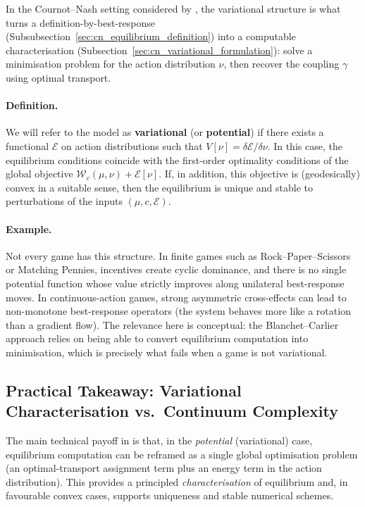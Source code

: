 In the Cournot--Nash setting considered by \cite{blanchet2016optimal}, the variational structure is what turns a
definition-by-best-response (Subsubsection~\ref{sec:cn_equilibrium_definition}) into a computable characterisation
(Subsection~\ref{sec:cn_variational_formulation}): solve a minimisation problem for the action distribution $\nu$, then
recover the coupling $\gamma$ using optimal transport.

\paragraph{Definition.}
We will refer to the model as \textbf{variational} (or \textbf{potential}) if there exists a functional
$\mathcal{E}$ on action distributions such that $V[\nu]=\delta\mathcal{E}/\delta\nu$.
In this case, the equilibrium conditions coincide with the first-order optimality conditions of the global objective
$\mathcal{W}_c(\mu,\nu)+\mathcal{E}[\nu]$.
If, in addition, this objective is (geodesically) convex in a suitable sense, then the equilibrium is unique and stable
to perturbations of the inputs $(\mu,c,\mathcal{E})$.

\paragraph{Example.}
Not every game has this structure. In finite games such as Rock--Paper--Scissors or Matching Pennies, incentives create
cyclic dominance, and there is no single potential function whose value strictly improves along unilateral best-response
moves. In continuous-action games, strong asymmetric cross-effects can lead to non-monotone best-response operators (the
system behaves more like a rotation than a gradient flow). The relevance here is conceptual: the Blanchet--Carlier
approach relies on being able to convert equilibrium computation into minimisation, which is precisely what fails when a
game is not variational.

\subsection{Practical Takeaway: Variational Characterisation vs.\ Continuum Complexity}
\label{sec:cn_weakstar_gap}
\label{sec:cn_variational_formulation}
The main technical payoff in \cite{blanchet2016optimal} is that, in the \emph{potential} (variational) case, equilibrium
computation can be reframed as a single global optimisation problem (an optimal-transport assignment term plus an energy
term in the action distribution). This provides a principled \emph{characterisation} of equilibrium and, in favourable
convex cases, supports uniqueness and stable numerical schemes.

